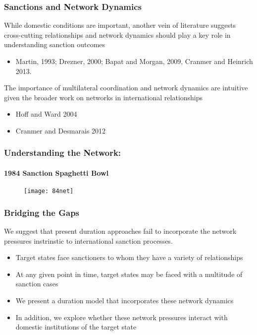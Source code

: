 \documentclass{beamer}
\begin{document}
\begin{frame}
\frametitle{Sanctions and Network Dynamics}
While domestic conditions are important, another vein of literature suggests cross-cutting relationships and network dynamics should play a key role in understanding sanction outcomes 
\begin{itemize}
\item Martin, 1993; Drezner, 2000; Bapat and Morgan, 2009, Cranmer and Heinrich 2013. 
\end{itemize}

The importance of multilateral coordination and network dynamics are intuitive given the broader work on networks in international relationships 
\begin{itemize}
\item Hoff and Ward 2004
\item Cranmer and Desmarais 2012
\end{itemize} 
\end{frame}

\begin{frame}
\frametitle{Understanding the Network:}
\framesubtitle{1984 Sanction Spaghetti Bowl}
\vspace{-0.25cm}
\begin{figure}[ht]
  \centering
  \texttt{[image: 84net]}
\end{figure}

\end{frame}

\begin{frame}
\frametitle{Bridging the Gaps}
We suggest that present duration approaches fail to incorporate the network pressures instrinstic to international sanction processes. 

\begin{itemize}
	\item Target states face sanctioners to whom they have a variety of relationships
	\item At any given point in time, target states may be faced with a multitude of sanction cases
	\item We present a duration model that incorporates these network dynamics
	\item In addition, we explore whether these network pressures interact with domestic institutions of the target state
\end{itemize}

\end{frame}
\end{document}
